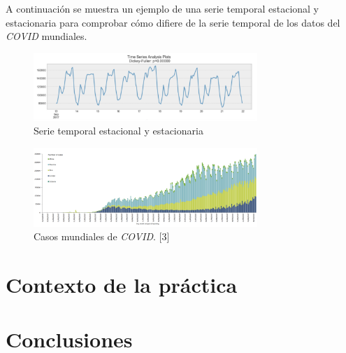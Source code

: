 \documentclass[12pt,a4paper, xcolor=table]{article}
\begin{document}
    A continuación se muestra un ejemplo de una serie temporal estacional y estacionaria para comprobar cómo difiere de la serie temporal de los datos del \textit{COVID} mundiales.

        \begin{figure}[h]
                \centering
                \includegraphics[width=320px]{img/estacional.png}
                \caption{Serie temporal estacional y estacionaria}
                \label{fig:graf_exp1}
            \end{figure}


        \begin{figure}[h]
                \centering
                \includegraphics[width=320px]{img/covid-cases.png}
                \caption{Casos mundiales de \textit{COVID}. [3]}
                \label{fig:graf_exp1}
            \end{figure}




\section{Contexto de la práctica}


 \section{Conclusiones}

\clearpage
\end{document}
